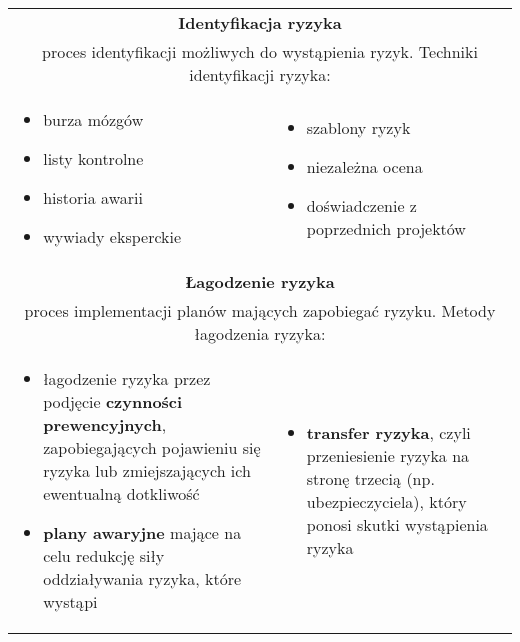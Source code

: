 \documentclass[../main.tex]{subfiles}
\begin{document}
    \begin{table}[H]
        \begin{center}
            \begin{tabular}{| p{8cm}  p{8cm} |}
                \hline
                \multicolumn{2}{|c|}{\textbf{Identyfikacja ryzyka}} \\
                \multicolumn{2}{|c|}{proces identyfikacji możliwych do wystąpienia ryzyk. Techniki identyfikacji
                ryzyka:} \\
                \hline
                \begin{itemize}
                    \item burza mózgów
                    \item listy kontrolne
                    \item historia awarii
                    \item wywiady eksperckie
                \end{itemize}
                &
                \begin{itemize}
                    \item szablony ryzyk
                    \item niezależna ocena
                    \item doświadczenie z poprzednich projektów
                \end{itemize} \\
                \hline
                \hline
                \multicolumn{2}{|c|}{\textbf{Łagodzenie ryzyka}} \\
                \multicolumn{2}{|c|}{proces implementacji planów mających zapobiegać ryzyku. Metody łagodzenia ryzyka:} \\
                \hline
                \begin{itemize}
                    \item łagodzenie ryzyka przez podjęcie \textbf{czynności prewencyjnych}, zapobiegających pojawieniu się ryzyka lub zmiejszających ich ewentualną dotkliwość
                    \item \textbf{plany awaryjne} mające na celu redukcję siły oddziaływania ryzyka, które wystąpi
                \end{itemize}
                &
                \begin{itemize}
                    \item \textbf{transfer ryzyka}, czyli przeniesienie ryzyka na stronę trzecią (np. ubezpieczyciela), który ponosi skutki wystąpienia ryzyka

\end{itemize}
\end{tabular}
\end{center}
\end{table}
\end{document}
